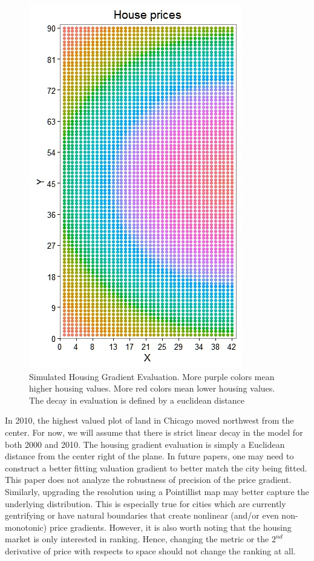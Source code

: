 {\begin{figure} %
    \centering
    \includegraphics[scale=0.6]{figures/House_Price.jpeg}
    \caption[Simulated Housing Gradient Evaluation]{Simulated Housing Gradient Evaluation. More purple colors mean higher housing values. More red colors mean lower housing values. The decay in evaluation is defined by a euclidean distance}
\end{figure}


In 2010, the highest valued plot of land in Chicago moved northwest from the center. For now, we will assume that there is strict linear decay in the model for both 2000 and 2010. The housing gradient evaluation is simply a Euclidean distance from the center right of the plane. In future papers, one may need to construct a better fitting valuation gradient to better match the city being fitted. This paper does not analyze the robustness of precision of the price gradient. Similarly, upgrading the resolution using a Pointillist map may better capture the underlying distribution. This is especially true for cities which are currently gentrifying or have natural boundaries that create nonlinear (and/or even non-monotonic) price gradients. However, it is also worth noting that the housing market is only interested in ranking. Hence, changing the metric or the $2^{nd}$ derivative of price with respects to space should not change the ranking at all.

}
